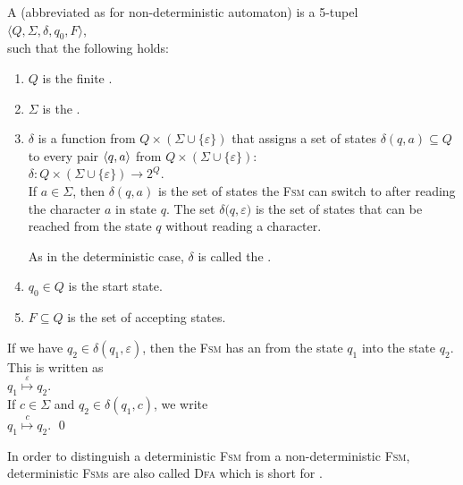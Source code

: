 \begin{Definition}[NFA]
A  
(abbreviated as  for non-deterministic automaton) 
is a  5-tupel  
\\[0.2cm]
\hspace*{1.3cm}
$\langle Q, \Sigma, \delta, q_0, F\rangle$,
\\[0.2cm]
such that the following holds:
\begin{enumerate}
\item $Q$ is the finite .
\item $\Sigma$ is the .
\item $\delta$ is a function from $Q \times (\Sigma \cup \{ \varepsilon \})$ that assigns a set of states
      $\delta(q, a) \subseteq Q$ to every pair $\pair(q, a)$ from $Q \times (\Sigma \cup \{ \varepsilon \})$:
      \\[0.2cm]
      \hspace*{1.3cm}
      $\delta: Q \times (\Sigma \cup \{\varepsilon\}) \rightarrow 2^Q$.
      \\[0.2cm]
      If $a \in \Sigma$, then $\delta(q, a)$ is the set of states the \textsc{Fsm} can switch to
      after reading the character $a$ in state $q$.  The set $\delta\bigl(q, \varepsilon)$ is the
      set of states that can be reached from the state $q$ without reading a character.
      
      As in the deterministic case, $\delta$ is called the .
\item $q_0 \in Q$ is the start state.
\item $F \subseteq Q$ is the set of accepting states. 
\end{enumerate}
If we have $q_2 \in \delta(q_1, \varepsilon)$, then the \textsc{Fsm} has an
 from the state $q_1$ into the state $q_2$.  This is written as
\\[0.2cm]
\hspace*{1.3cm}
$q_1 \stackrel{\varepsilon}{\mapsto} q_2$.
\\[0.2cm]
If  $c \in \Sigma$ and  $q_2 \in \delta(q_1, c)$, we write
\\[0.2cm]
\hspace*{1.3cm}
$q_1 \stackrel{c}{\mapsto} q_2$. \qed
\end{Definition}

In order to distinguish a deterministic \textsc{Fsm} from a non-deterministic \textsc{Fsm}, deterministic
\textsc{Fsm}s are also called \textsc{Dfa}  which is short for 
. 


